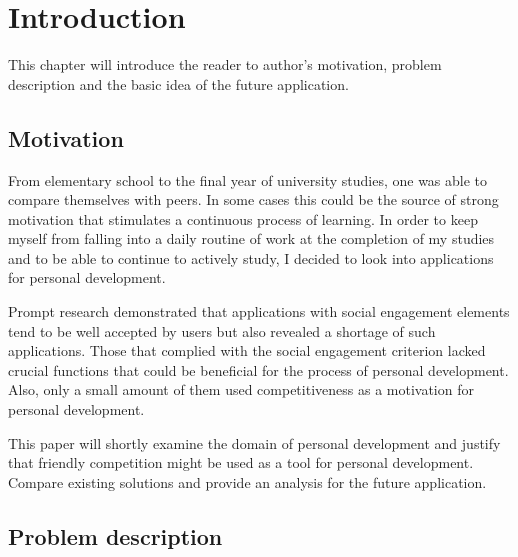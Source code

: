 

\chapter{Introduction}\label{ch:introduction}

This chapter will introduce the reader to author's motivation, problem description and the basic idea of the future application.


\section{Motivation}\label{sec:introduction-motivation}

From elementary school to the final year of university studies, one was able to compare themselves with peers.
In some cases this could be the source of strong motivation that stimulates a continuous process of learning.
In order to keep myself from falling into a daily routine of work at the completion of my studies and to be able to continue to actively study, I decided to look
into applications for personal development.

Prompt research demonstrated that applications with social engagement elements tend to be well accepted by users
but also revealed a shortage of such applications.
Those that complied with the social engagement criterion lacked crucial functions that could be beneficial for the process of personal development.
Also, only a small amount of them used competitiveness as a motivation for personal development.

This paper will shortly examine the domain of personal development and justify that friendly competition might be used as a tool for personal development.
Compare existing solutions and provide an analysis for the future application.


\section{Problem description}\label{sec:problem-description}

